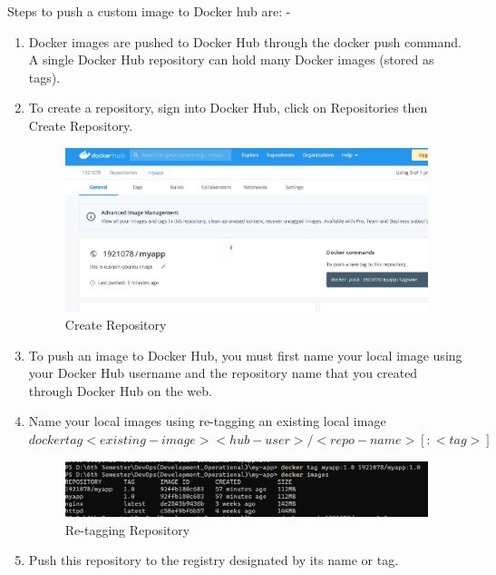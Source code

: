 \documentclass[12pt]{article}
\begin{document}
Steps to push a custom image  to Docker hub are: -

\begin{enumerate}

\item Docker images are pushed to Docker Hub through the docker push command. A single Docker Hub repository can hold many Docker images (stored as tags).


\item To create a repository, sign into Docker Hub, click on Repositories then Create Repository.

\begin{figure}[H]
\centering
\includegraphics[scale=0.5]{fig39}
\caption{Create Repository}
\vspace{0.6\baselineskip}
\end{figure}	

\item To push an image to Docker Hub, you must first name your local image using your Docker Hub username and the repository name that you created through Docker Hub on the web.


\item Name your local images using  re-tagging an existing local image $ docker tag <existing-image> <hub-user>/<repo-name>[:<tag>]$

\begin{figure}[H]
\centering
\includegraphics[scale=0.5]{fig40}
\caption{Re-tagging Repository}
\vspace{0.6\baselineskip}
\end{figure}

\item Push this repository to the registry designated by its name or tag.


\end{enumerate}
\end{document}
